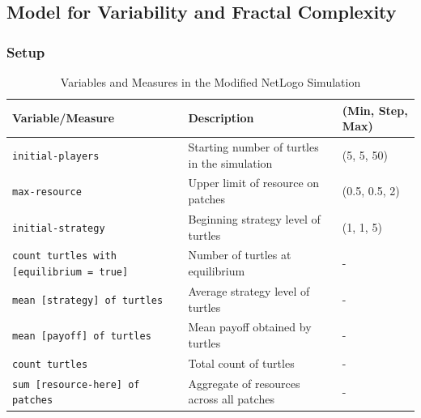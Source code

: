 \documentclass[sn-nature]{sn-jnl}%
\theoremstyle{thmstyleone}%
\theoremstyle{thmstyletwo}%
\theoremstyle{thmstylethree}%
\begin{document}
\subsection{Model for Variability and Fractal Complexity}
\subsubsection{Setup}
\begin{table}[h!]
\centering
\begin{tabular}{|l|l|l|}
\hline
\textbf{Variable/Measure} & \textbf{Description} & \textbf{(Min, Step, Max)} \\
\hline
\texttt{initial-players} & Starting number of turtles in the simulation & (5, 5, 50) \\
\hline
\texttt{max-resource} & Upper limit of resource on patches & (0.5, 0.5, 2) \\
\hline
\texttt{initial-strategy} & Beginning strategy level of turtles & (1, 1, 5) \\
\hline
\texttt{count turtles with [equilibrium = true]} & Number of turtles at equilibrium & - \\
\hline
\texttt{mean [strategy] of turtles} & Average strategy level of turtles & - \\
\hline
\texttt{mean [payoff] of turtles} & Mean payoff obtained by turtles & - \\
\hline
\texttt{count turtles} & Total count of turtles & - \\
\hline
\texttt{sum [resource-here] of patches} & Aggregate of resources across all patches & - \\
\hline
\end{tabular}
\caption{Variables and Measures in the Modified NetLogo Simulation}
\label{tab:modified-netlogo-vars-measures}
\end{table}
\end{document}
